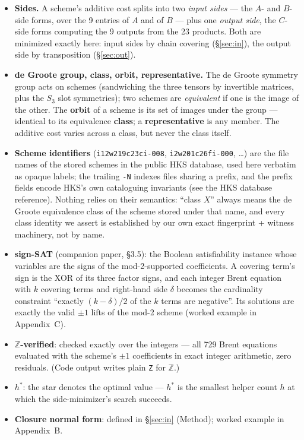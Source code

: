 \documentclass[10pt]{article}
\begin{document}
\begin{itemize}
\item \textbf{Sides.} A scheme's additive cost splits into two
  \emph{input sides} --- the $A$- and $B$-side forms, over the 9
  entries of $A$ and of $B$ --- plus one \emph{output side}, the
  $C$-side forms computing the 9 outputs from the 23 products. Both are
  minimized exactly here: input sides by chain covering
  (\S\ref{sec:in}), the output side by transposition
  (\S\ref{sec:out}).
\item \textbf{de Groote group, class, orbit, representative.} The de
  Groote symmetry group acts on schemes (sandwiching the three tensors
  by invertible matrices, plus the $S_3$ slot symmetries); two schemes
  are \emph{equivalent} if one is the image of the other. The
  \textbf{orbit} of a scheme is its set of images under the group ---
  identical to its equivalence \textbf{class}; a \textbf{representative}
  is any member. The additive cost varies across a class, but never the
  class itself.
\item \textbf{Scheme identifiers} (\texttt{i12w219c23ci-008},
  \texttt{i2w201c26fi-000}, \dots) are the file names of the stored
  schemes in the public HKS database, used here verbatim as opaque
  labels; the trailing \texttt{-N} indexes files sharing a prefix, and
  the prefix fields encode HKS's own cataloguing invariants (see the
  HKS database reference). Nothing relies on their semantics: ``class
  $X$'' always means the de Groote equivalence class of the scheme
  stored under that name, and every class identity we assert is
  established by our own exact fingerprint + witness machinery, not by
  name.
\item \textbf{sign-SAT} (companion paper, \S 3.5): the Boolean
  satisfiability instance whose variables are the signs of the
  mod-2-supported coefficients. A covering term's sign is the XOR of
  its three factor signs, and each integer Brent equation with $k$
  covering terms and right-hand side $\delta$ becomes the cardinality
  constraint ``exactly $(k-\delta)/2$ of the $k$ terms are negative''.
  Its solutions are exactly the valid $\pm 1$ lifts of the mod-2 scheme
  (worked example in Appendix~C).
\item \textbf{$\mathbb{Z}$-verified}: checked exactly over the integers
  --- all 729 Brent equations evaluated with the scheme's $\pm 1$
  coefficients in exact integer arithmetic, zero residuals. (Code
  output writes plain \texttt{Z} for $\mathbb{Z}$.)
\item \textbf{$h^{*}$}: the star denotes the optimal value --- $h^{*}$
  is the smallest helper count $h$ at which the side-minimizer's search
  succeeds.
\item \textbf{Closure normal form}: defined in \S\ref{sec:in}
  (Method); worked example in Appendix~B.
\end{itemize}
\end{document}
